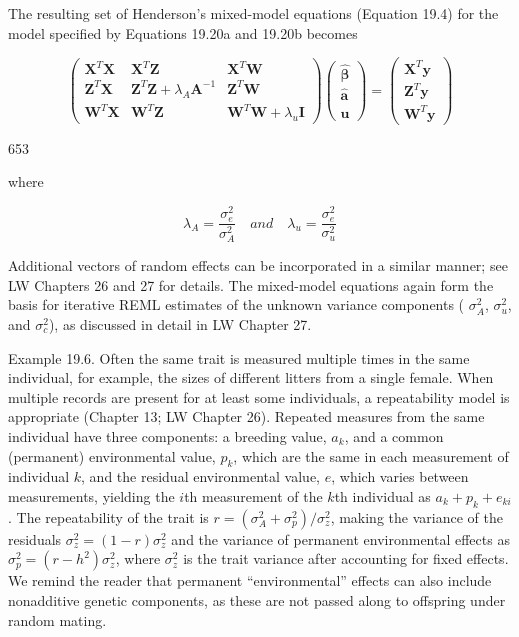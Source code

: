 \documentclass{article}
\begin{document}
The resulting set of Henderson’s mixed-model equations (Equation 19.4) for the model specified by Equations 19.20a and 19.20b becomes

\begin{equation}
\begin{pmatrix}\mathbf{X}^{T}\mathbf{X}&\mathbf{X}^{T}\mathbf{Z}&\mathbf{X}^{T}\mathbf{W}\\\mathbf{Z}^{T}\mathbf{X}&\mathbf{Z}^{T}\mathbf{Z}+\lambda_{A}\mathbf{A}^{-1}&\mathbf{Z}^{T}\mathbf{W}\\\mathbf{W}^{T}\mathbf{X}&\mathbf{W}^{T}\mathbf{Z}&\mathbf{W}^{T}\mathbf{W}+\lambda_{u}\mathbf{I}\end{pmatrix}\begin{pmatrix}\widehat{\boldsymbol{\beta}}\\\widehat{\mathbf{a}}\\\widehat{\mathbf{u}}\end{pmatrix}=\begin{pmatrix}\mathbf{X}^{T}\mathbf{y}\\\mathbf{Z}^{T}\mathbf{y}\\\mathbf{W}^{T}\mathbf{y}\end{pmatrix}
\tag{19.21a}
\label{eq:19_21a}
\end{equation}

653

where

\begin{equation}
\lambda_{A}=\frac{\sigma_{e}^{2}}{\sigma_{A}^{2}}\quad and\quad\lambda_{u}=\frac{\sigma_{e}^{2}}{\sigma_{u}^{2}}
\tag{19.21b}
\label{eq:19_21b}
\end{equation}

Additional vectors of random effects can be incorporated in a similar manner; see LW Chapters 26 and 27 for details. The mixed-model equations again form the basis for iterative REML estimates of the unknown variance components ( $ \sigma_A^2 $,  $ \sigma_u^2 $, and  $ \sigma_c^2 $), as discussed in detail in LW Chapter 27.

Example 19.6. Often the same trait is measured multiple times in the same individual, for example, the sizes of different litters from a single female. When multiple records are present for at least some individuals, a repeatability model is appropriate (Chapter 13; LW Chapter 26). Repeated measures from the same individual have three components: a breeding value,  $ a_k $, and a common (permanent) environmental value,  $ p_k $, which are the same in each measurement of individual  $ k $, and the residual environmental value,  $ e $, which varies between measurements, yielding the  $ i $th measurement of the  $ k $th individual as  $ a_k + p_k + e_{ki} $. The repeatability of the trait is  $ r = (\sigma_A^2 + \sigma_p^2)/\sigma_z^2 $, making the variance of the residuals  $ \sigma_z^2 = (1 - r)\sigma_z^2 $ and the variance of permanent environmental effects as  $ \sigma_p^2 = (r - h^2)\sigma_z^2 $, where  $ \sigma_z^2 $ is the trait variance after accounting for fixed effects. We remind the reader that permanent “environmental” effects can also include nonadditive genetic components, as these are not passed along to offspring under random mating.
\end{document}
